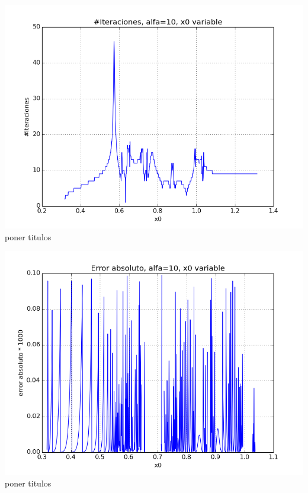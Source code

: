 \begin{center}
\includegraphics[scale=0.5]{graficos/iteraciones-e-secante-alfa_fijo-absoluto-0.0001-alejando.png}\\
poner titulos
\end{center}

\begin{center}
\includegraphics[scale=0.5]{graficos/x0s-e-secante-alfa_fijo-absoluto-0.0001-alejando.png}\\
poner titulos
\end{center}

